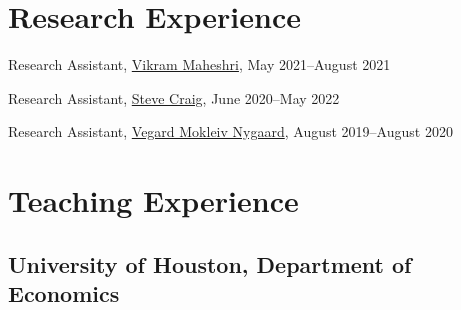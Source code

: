 \documentclass[10pt,letterpaper]{article}
\renewenvironment{itemize}{
  \begin{list}{}{
    \setlength{\leftmargin}{1.5em}
  }
}{
  \end{list}
}
\begin{document}

\section*{Research Experience}

\begin{itemize}
  \item Research Assistant,
  \href{https://vmaheshri.github.io/}{Vikram Maheshri},
  May 2021--August 2021

  \item Research Assistant,
  \href{https://www.uh.edu/class/economics/people/current-faculty/steve/}{Steve Craig},
  June 2020--May 2022
  \item Research Assistant,
  \href{https://sites.google.com/site/vegardmokleivnygaard/}{Vegard Mokleiv Nygaard},
  August 2019--August 2020
\end{itemize}

\section*{Teaching Experience}
\subsection*{University of Houston, Department of Economics}
\end{document}

